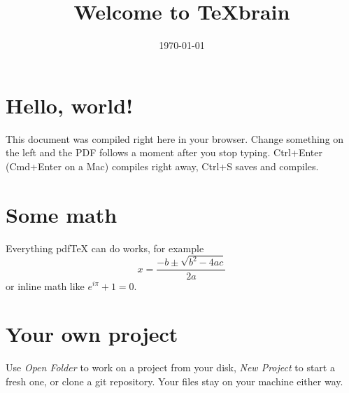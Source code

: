 \documentclass{article}
\title{Welcome to TeXbrain}
\author{}
\date{\today}
\begin{document}
\maketitle

\section{Hello, world!}

This document was compiled right here in your browser. Change something on
the left and the PDF follows a moment after you stop typing. Ctrl+Enter
(Cmd+Enter on a Mac) compiles right away, Ctrl+S saves and compiles.

\section{Some math}

Everything pdfTeX can do works, for example
\begin{equation}
  x = \frac{-b \pm \sqrt{b^2 - 4ac}}{2a}
\end{equation}
or inline math like $e^{i\pi} + 1 = 0$.

\section{Your own project}

Use \emph{Open Folder} to work on a project from your disk, \emph{New Project}
to start a fresh one, or clone a git repository. Your files stay on your
machine either way.
\end{document}
